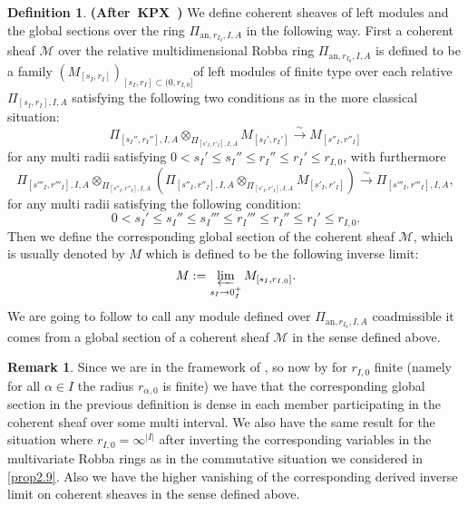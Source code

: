 \documentclass[12pt]{amsart}
\theoremstyle{definition}
\newtheorem{definition}[theorem]{Definition}
\newtheorem{remark}[theorem]{Remark}
\numberwithin{equation}{section}
\begin{document}
\begin{definition} \mbox{\bf{(After KPX \cite[Definition 2.1.3]{KPX})}}
We define coherent sheaves of left modules and the global sections over the ring $\Pi_{\mathrm{an},r_{I_0},I,A}$ in the following way. First a coherent sheaf $\mathcal{M}$ over the relative multidimensional Robba ring $\Pi_{\mathrm{an},r_{I_0},I,A}$ is defined to be a family $(M_{[s_I,r_I]})_{[s_I,r_I]\subset (0,r_{I,0}]}$of left modules of finite type over each relative $\Pi_{[s_I,r_I],I,A}$ satisfying the following two conditions as in the more classical situation:
\begin{displaymath}
\Pi_{[s_I'',r_I''],I,A}\otimes_{\Pi_{[s'_I,r'_I],I,A}}M_{[s_I',r_I']}\overset{\sim}{\rightarrow} M_{[s''_I,r''_I]}	
\end{displaymath}
for any multi radii satisfying $0<s_I'\leq s_I''\leq r_I''\leq r_I'\leq r_{I,0}$, with furthermore 
\begin{displaymath}
\Pi_{[s'''_I,r'''_I],I,A}\otimes_{\Pi_{[s''_I,r''_I],I,A}}(\Pi_{[s''_I,r''_I],I,A}	\otimes_{\Pi_{[s'_I,r'_I],I,A}}M_{[s'_I,r'_I]}) \overset{\sim}{\rightarrow}\Pi_{[s'''_I,r'''_I],I,A},
\end{displaymath}
for any multi radii satisfying the following condition:
\begin{displaymath}
0<s_I'\leq s_I''\leq s_I'''\leq r_I'''\leq r_I''\leq r_I'\leq r_{I,0}.	
\end{displaymath}
Then we define the corresponding global section of the coherent sheaf $\mathcal{M}$, which is usually denoted by $M$ which is defined to be the following inverse limit:
\begin{displaymath}
M:=\varprojlim_{s_I\rightarrow 0_I^+} M_{[s_I,r_{I,0}]}.	
\end{displaymath}
We are going to follow \cite[Definition 2.1.3]{KPX} to call any module defined over $\Pi_{\mathrm{an},r_{I_0},I,A}$ coadmissible it comes from a global section of a coherent sheaf $\mathcal{M}$ in the sense defined above. 
\end{definition}


\begin{remark}
Since we are in the framework of \cite[Chapter 3]{ST1}, so now by \cite[Chapter 3, Theorem]{ST1} for $r_{I,0}$ finite (namely for all $\alpha\in I$ the radius $r_{\alpha,0}$ is finite) we have that the corresponding global section in the previous definition is dense in each member participating in the coherent sheaf over some multi interval. We also have the same result for the situation where $r_{I,0}=\infty^{|I|}$ after inverting the corresponding variables in the multivariate Robba rings as in the commutative situation we considered in \cref{prop2.9}. Also we have the higher vanishing of the corresponding derived inverse limit on coherent sheaves in the sense defined above.	
\end{remark}
\end{document}

